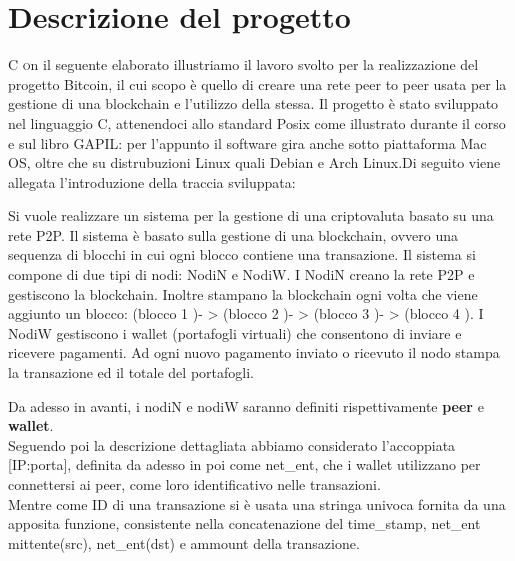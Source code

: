 \documentclass[a4paper,10pt]{report}
\begin{document}


  \tableofcontents
  \listoftables
  \listoffigures
  \lstlistoflistings

  \chapter{Descrizione del progetto}
  
  \lettrine[lraise=0.1]{C }on il seguente elaborato illustriamo il lavoro svolto per la realizzazione del progetto Bitcoin, il cui scopo è quello di creare una rete peer to peer usata per la gestione di una blockchain e l'utilizzo della stessa. Il progetto è stato sviluppato nel linguaggio C, attenendoci allo standard Posix come illustrato durante il corso e sul libro GAPIL: per l'appunto il software gira anche sotto piattaforma Mac OS, oltre che su distrubuzioni Linux quali Debian e Arch Linux.\newline Di seguito viene allegata l'introduzione della traccia sviluppata:
  \begin{framed} Si vuole realizzare un sistema per la gestione di una criptovaluta basato su una rete P2P. Il sistema è basato sulla gestione di una blockchain, ovvero una sequenza di blocchi in cui ogni blocco contiene una transazione. Il sistema si compone di due tipi di nodi: NodiN e NodiW. I NodiN creano la rete P2P e gestiscono la blockchain. Inoltre stampano la blockchain ogni volta che viene aggiunto un blocco: (blocco 1 )- > (blocco 2 )- > (blocco 3 )- > (blocco 4 ). I NodiW gestiscono i wallet (portafogli virtuali) che consentono di inviare e ricevere pagamenti. Ad ogni nuovo pagamento inviato o ricevuto il nodo stampa la transazione ed il totale del portafogli. 
\end{framed}
Da adesso in avanti, i nodiN e nodiW saranno definiti rispettivamente \textbf{peer} e \textbf{wallet}.
\\ Seguendo poi la descrizione dettagliata abbiamo considerato l'accoppiata [IP:porta], definita da adesso in poi come net_ent, che i wallet utilizzano per connettersi ai peer, come loro identificativo nelle transazioni.\\
Mentre come ID di una transazione si è usata una stringa univoca fornita da una apposita funzione, consistente nella concatenazione del time_stamp, net_ent mittente(src), net_ent(dst) e ammount della transazione. 
\end{document}

